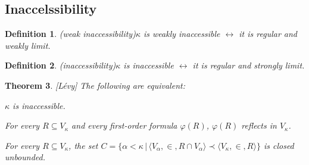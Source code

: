 \documentclass[12pt,a4paper]{article}
\newtheorem{theorem}{Theorem}[section]
\newtheorem{definition}[theorem]{Definition}
\newcommand{\set}[2]{\ensuremath{\{#1 \,|\, #2 \}}}
\renewcommand{\iff}{\leftrightarrow}
\newcommand{\el}{\prec}
\newcommand{\sub}{\subseteq}
\newcommand{\bce}{\begin{compactenum}}
\newcommand{\ece}{\end{compactenum}}
\begin{document}
\subsection{Inaccelssibility}
\begin{definition}(weak inaccessibility)\label{def:weakly_inaccessible}
$\kappa$ is \emph{weakly inaccessible} $\iff$ it is \emph{regular} and \emph{ weakly limit}.
\end{definition}
\begin{definition}(inaccessibility)\label{def:inaccessible} %
$\kappa$ is \emph{inaccessible} $\iff$ it is \emph{regular} and \emph{strongly limit}.
\end{definition}
\begin{theorem}\label{th:refl_inaccessible}[Lévy] The following are equivalent:
\bce[(i)]
\item $\kappa$ is inaccessible.
\item For every $R \sub V_\kappa$ and every first-order formula $\varphi(R)$, $\varphi(R)$ reflects in $V_\kappa$.
\item For every $R \sub V_\kappa$, the set $C = \set{\alpha<\kappa}{\langle V_\alpha,\in,R \cap V_\alpha\rangle \el \langle V_\kappa,\in,R \rangle}$ is closed unbounded.
\ece
\end{theorem}
\end{document}
